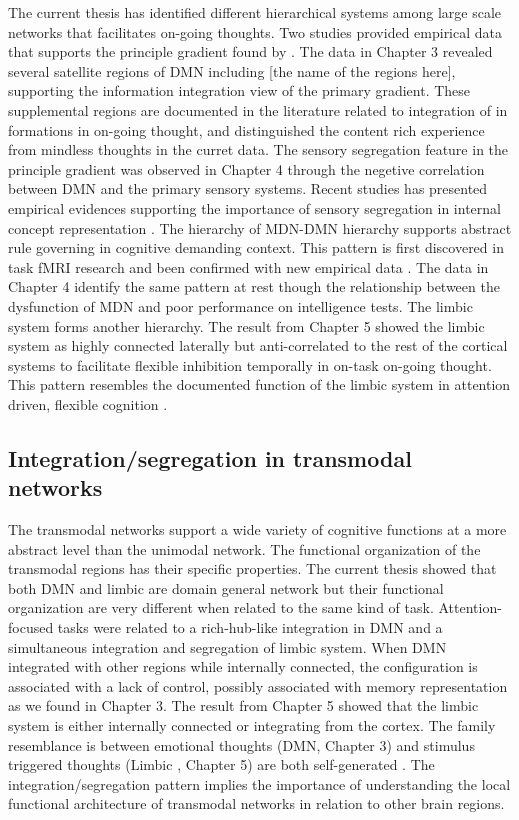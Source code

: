 The current thesis has identified different hierarchical systems among large scale networks that facilitates on-going thoughts. Two studies provided empirical data that supports the principle gradient found by . 
The data in Chapter 3 %
revealed several satellite regions of DMN including [the name of the regions here], supporting the information integration view of the primary gradient. These supplemental regions are documented in the literature related to integration of in formations in on-going thought\cite{Ellamil2016,Karapanagiotidis2017,Smallwood2016}, and distinguished the content rich experience from mindless thoughts in the curret data. The sensory segregation feature in the principle gradient was observed in Chapter 4 %
through the negetive correlation between DMN and the primary sensory systems. Recent studies has presented empirical evidences supporting the importance of sensory segregation in internal concept representation \cite{Murphy2018,Villena-Gonzalez2018}. The hierarchy of MDN-DMN hierarchy supports abstract rule governing in cognitive demanding context. This pattern is first discovered in task fMRI research \cite{Duncan2010} and been confirmed with new empirical data \cite{Crittenden2016}. The data in Chapter 4 %
identify the same pattern at rest though the relationship between the dysfunction of MDN and poor performance on intelligence tests. The limbic system forms another hierarchy. The result from Chapter 5 %
showed the limbic system as highly connected laterally but anti-correlated to the rest of the cortical systems to facilitate flexible inhibition temporally in on-task on-going thought. This pattern resembles the documented function of the limbic system in attention driven, flexible cognition \cite{Kleckner2017}.

\subsection{Integration/segregation in transmodal networks}
The transmodal networks support a wide variety of cognitive functions at a more abstract level than the unimodal network. The functional organization of the transmodal regions has their specific properties. The current thesis showed that both DMN and limbic are domain general network but their functional organization are very different when related to the same kind of task. Attention-focused tasks were related to a rich-hub-like integration in DMN and a simultaneous integration and segregation of limbic system. When DMN integrated with other regions while internally connected, the configuration is associated with a lack of control, possibly associated with memory representation as we found in Chapter 3. The result from Chapter 5 showed that the limbic system is either internally connected or integrating from the cortex. The family resemblance is between emotional thoughts (DMN, Chapter 3) and stimulus triggered thoughts (Limbic , Chapter 5) are both self-generated \cite{Tusche2014}. The integration/segregation pattern implies the importance of understanding the local functional architecture \cite{Braga2015} of transmodal networks in relation to other brain regions.

